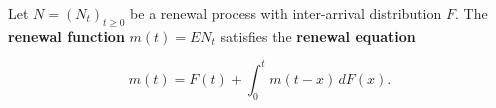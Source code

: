 Let $N = (N_t)_{t \geq 0}$ be a renewal process with inter-arrival distribution $F$. The \textbf{renewal function} $m(t) = E N_t$ satisfies the \textbf{renewal equation}

$$m(t) = F(t) + \int_0^t m(t - x) \, dF(x).$$
